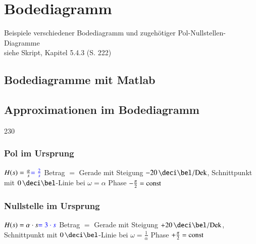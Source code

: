 \section{Bodediagramm}

Beispiele verschiedener Bodediagramm und zugehötiger Pol-Nullstellen-Diagramme \\
siehe Skript, Kapitel 5.4.3 (S. 222)


\subsection{Bodediagramme mit Matlab}




\subsection{Approximationen im Bodediagramm}{230}

\begin{minipage}[t]{0.48\columnwidth}
    \raggedright
    \subsubsection{Pol im Ursprung}

    \begin{outline}
        \1 $H(s) = \frac{\alpha}{s} {\color{blue}= \frac{2}{s}}$
            \2 Betrag $=$ Gerade mit Steigung $- 20 \, \deci \bel / \Dek$, Schnittpunkt mit $0 \, \deci\bel$-Linie bei $\omega = \alpha$
            \2 Phase $- \frac{\pi}{2} = \mathrm{const}$
    \end{outline}
\end{minipage}
\hfill
\begin{minipage}[t]{0.48\columnwidth}
    \raggedright
    \subsubsection{Nullstelle im Ursprung}

    \begin{outline}
        \1 $H(s) = \alpha \cdot s {\color{blue}= 3\cdot s}$
            \2 Betrag $=$ Gerade mit Steigung $+ 20 \, \deci \bel / \Dek$, Schnittpunkt mit $0 \, \deci\bel$-Linie bei $\omega = \frac{1}{\alpha}$
            \2 Phase $+ \frac{\pi}{2} = \mathrm{const}$
    \end{outline}
\end{minipage}

\begin{minipage}[t]{0.48\columnwidth}
    
\end{minipage}
\hfill
\begin{minipage}[t]{0.48\columnwidth}
    
\end{minipage}


